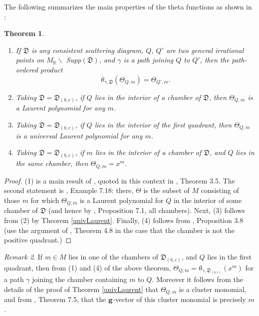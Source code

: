 \documentclass[10pt]{amsart}
\newcommand{\saySS}[1]{\say[SS]{#1}}
\newtheorem{theorem}{Theorem}[section]
\theoremstyle{remark}
\newtheorem{remark}[theorem]{Remark}
\numberwithin{equation}{section}
\newcommand{\RR}{\mathbb{R}}
\newcommand{\fD}{\mathfrak{D}}
\newcommand{\bfg}{{\bf g}}
\begin{document}
The following summarizes the main properties of the theta functions as shown in
\cite{GHKK}:
\begin{theorem} $ $
  \begin{enumerate}
    \item
      If $\fD$ is any consistent scattering diagram, $Q$, $Q'$ are two general
      irrational points on $M_{\RR} \backslash$ Supp$(\fD)$, and $\gamma$ is a
      path joining $Q$ to $Q'$, then the path-ordered product 
      \saySS{Do you like this phrasing?}
      \[
        \theta_{\gamma, \fD }(\Theta_{Q,m}) = \Theta_{Q', m}. 
      \]
    
    \item 
      Taking $\fD=\fD_{(b,c)}$, if $Q$ lies in the interior of a chamber of
      $\fD$, then $\Theta_{Q,m}$ is a Laurent polynomial for any $m$.
    
    \item 
      Taking $\fD=\fD_{(b,c)}$, if $Q$ lies in the interior of the first
      quadrant, then $\Theta_{Q,m}$ is a universal Laurent polynomial for
      any $m$.

    \item 
      Taking $\fD=\fD_{(b,c)}$, if $m$ lies in the interior of a chamber of
      $\fD$, and $Q$ lies in the same chamber, then $\Theta_{Q,m}=x^{m}$.
   
  \end{enumerate}
\end{theorem}

\begin{proof}
  (1) is a main result of \cite{CPS}, quoted in this context in \cite{GHKK},
  Theorem 3.5.  The second statement is \cite{GHKK}, Example 7.18: there,
  $\Theta$ is the subset of $M$ consisting of those $m$ for which
  $\Theta_{Q,m}$ is a Laurent polynomial for $Q$ in the interior of 
  some chamber of $\fD$ (and hence by \cite{GHKK}, Proposition 7.1, all 
  chambers).
  Next, (3) follows from (2) by Theorem \ref{univLaurent}. 
  Finally, (4) follows from \cite{GHKK}, Proposition 3.8 (use the argument of
  \cite{GHKK}, Theorem 4.8 in the case that the chamber is not the positive
  quadrant.)
\end{proof}

\begin{remark} 
  \label{rk:theta functions g-vector}
  If $m\in M$ lies in one of the chambers of $\fD_{(b,c)}$, and $Q$ lies in
  the first quadrant, then from (1) and (4) of the above theorem,
  $\Theta_{Q,m}=\theta_{\gamma,\fD_{(b,c)}}(x^{m})$ for a path $\gamma$
  joining the chamber containing $m$ to $Q$. Moreover it follows from the
  details of the proof of Theorem \ref{univLaurent} that $\Theta_{Q,m}$ is
  a cluster monomial, and from \cite{GHKK}, Theorem 7.5, that the 
  $\bfg$-vector of this cluster monomial is precisely $m$. 
\end{remark}
\end{document}

